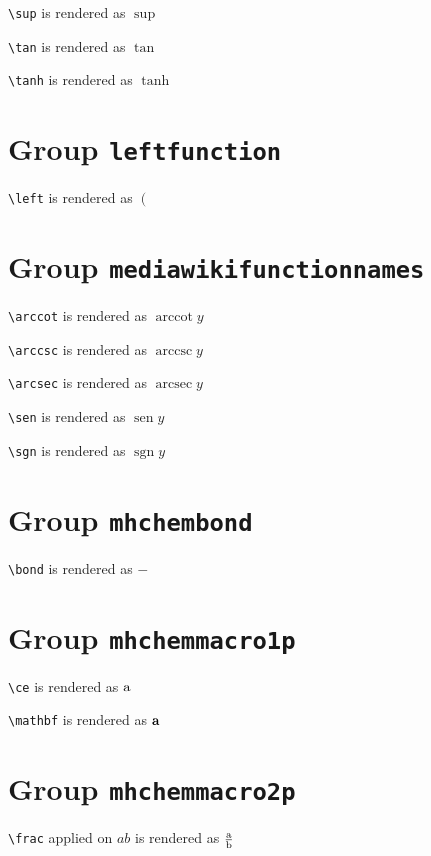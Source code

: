 \texttt{\textbackslash sup} is rendered as $\sup$

\texttt{\textbackslash tan} is rendered as $\tan$

\texttt{\textbackslash tanh} is rendered as $\tanh$

\section{ Group \texttt{left\textunderscore function}}

\texttt{\textbackslash left} is rendered as $\left( \right.$

\section{ Group \texttt{mediawiki\textunderscore function\textunderscore names}}

\texttt{\textbackslash arccot} is rendered as $\operatorname{arccot} y$

\texttt{\textbackslash arccsc} is rendered as $\operatorname{arccsc} y$

\texttt{\textbackslash arcsec} is rendered as $\operatorname{arcsec} y$

\texttt{\textbackslash sen} is rendered as $\operatorname{sen} y$

\texttt{\textbackslash sgn} is rendered as $\operatorname{sgn} y$

\section{ Group \texttt{mhchem\textunderscore bond}}

\texttt{\textbackslash bond} is rendered as $\ce{\bond{-}}$

\section{ Group \texttt{mhchem\textunderscore macro\textunderscore 1p}}

\texttt{\textbackslash ce} is rendered as $\ce{\ce{a}}$

\texttt{\textbackslash mathbf} is rendered as $\ce{\mathbf{a}}$

\section{ Group \texttt{mhchem\textunderscore macro\textunderscore 2p}}

\texttt{\textbackslash frac} applied on ${a}{b}$ is rendered as $\ce{\frac{a}{b}}$

